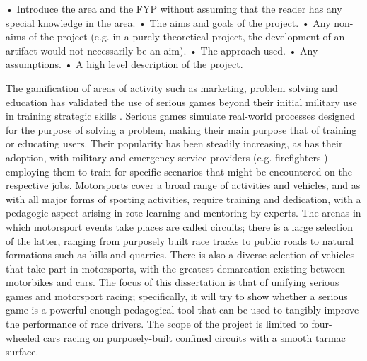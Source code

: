 \documentclass{article}
\begin{document}
• Introduce the area and the FYP without assuming that the reader has any special knowledge in the area.
• The aims and goals of the project.
• Any non-aims of the project (e.g. in a purely theoretical project, the development of an artifact would not necessarily be an aim).
• The approach used.
• Any assumptions.
• A high level description of the project.

The gamification of areas of activity such as marketing, problem solving and education \cite{michael2005serious} has validated the use of serious games beyond their initial military use in training strategic skills \cite{djaouti2011classifying}.  Serious games simulate real-world processes designed for the purpose of solving a problem, making their main purpose that of training or educating users. Their popularity has been steadily increasing, as has their adoption, with military \cite{djaouti2011classifying} and emergency service providers (e.g. firefighters \cite{michael2005serious}) employing them to train for specific scenarios that might be encountered on the respective jobs. Motorsports cover a broad range of activities and vehicles, and as with all major forms of sporting activities, require training and dedication, with a pedagogic aspect arising in rote learning and mentoring by experts. The arenas in which motorsport events take places are called circuits; there is a large selection of the latter, ranging from purposely built race tracks to public roads to natural formations such as hills and quarries. There is also a diverse selection of vehicles that take part in motorsports, with the greatest demarcation existing between motorbikes and cars. The focus of this dissertation is that of unifying serious games and motorsport racing; specifically, it will try to show whether a serious game is a powerful enough pedagogical tool that can be used to tangibly improve the performance of race drivers. The scope of the project is limited to four-wheeled cars racing on purposely-built confined circuits with a smooth tarmac surface.  
\end{document}
